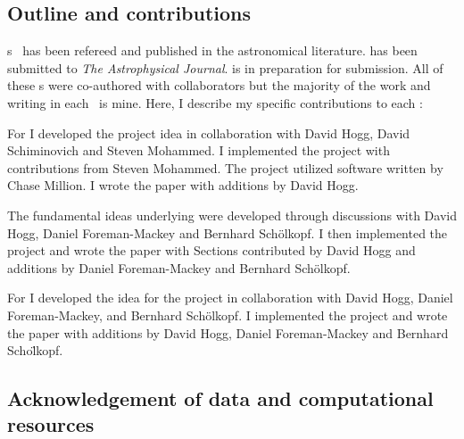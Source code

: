 \documentclass[12pt, preprint]{aastex}
\begin{document}
\subsection{Outline and contributions}
\chapname s~ has been refereed and
published in the astronomical literature.
 has been submitted to \emph{The Astrophysical Journal}.
 is in preparation for submission.
All of these \chapname s were co-authored with collaborators but the majority
of the work and writing in each \chapname\ is mine.
Here, I describe my specific contributions to each \chapname:
\begin{enumerate}

{\item For   I developed the project idea in collaboration with David Hogg, David Schiminovich and Steven Mohammed.
I implemented the project with contributions from Steven Mohammed.
The project utilized software written by Chase Million.
I wrote the paper with additions by David Hogg.}

{\item The fundamental ideas underlying  were developed through discussions with David Hogg, Daniel Foreman-Mackey and Bernhard Sch\"olkopf.
I then implemented the project and wrote the paper with Sections contributed by David Hogg and additions by Daniel Foreman-Mackey and Bernhard Sch\"olkopf.}

{\item For  I developed the idea for the project in collaboration with David Hogg, Daniel Foreman-Mackey, and Bernhard Sch\"olkopf.
I implemented the project and wrote the paper with additions by David Hogg, Daniel Foreman-Mackey and Bernhard Scho\"lkopf.
}
\end{enumerate}

\subsection{Acknowledgement of data and computational resources}
\end{document}
